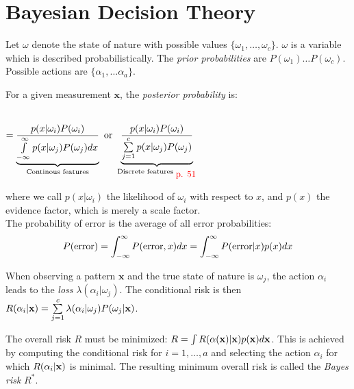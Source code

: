 \section{Bayesian Decision Theory}
\begin{minipage}{9.5cm}
Let $\omega$ denote the state of nature with possible values $\{\omega_1, \ldots, \omega_c\}$.
$\omega$ is a variable which is described probabilistically.
The \emph{prior probabilities} are $P(\omega_1) \ldots P(\omega_c)$.
Possible actions are $\{\alpha_1, \ldots \alpha_a\}$.

For a given measurement $\mathbf{x}$, the \emph{posterior probability} is:
\begin{center}
   \\
  $= \underbrace{\frac{p(x|\omega_i) P(\omega_i)}{\int\limits_{-\infty}^{\infty}p(x|\omega_j) P(\omega_j) dx}}_{\text{Continous features}}
    \text{ or } 
    \underbrace{\frac{p(x|\omega_i) P(\omega_i)}{\sum\limits_{j=1}^{c}p(x|\omega_j) P(\omega_j)}}_{\text{Discrete features $_{\textcolor{red}{\mbox{\small{p. 51}}}}$}}$
\end{center}
  
where we call $p(x|\omega_i)$ the likelihood of $\omega_i$ with respect to $x$, and $p(x)$ the evidence factor, which is merely a scale factor. \\

The probability of error is the average of all error probabilities:
\begin{align*}
    P(\mathrm{error}) &= \int_{-\infty}^{\infty} P(\mathrm{error}, x) dx = \int_{-\infty}^{\infty} P(\mathrm{error}|x) p(x) dx \\
\end{align*}

When observing a pattern $\mathbf{x}$ and the true state of nature is $\omega_j$, the action $\alpha_i$ leads to the \emph{loss} $\lambda(\alpha_i|\omega_j)$.
The conditional risk is then $R(\alpha_i|\mathbf{x}) = \sum\limits_{j=1}^c \lambda(\alpha_i|\omega_j)P(\omega_j|\mathbf{x})$.

The overall risk $R$ must be minimized: $R = \int R(\alpha(\mathbf{x})|\mathbf{x})p(\mathbf{x}) d\mathbf{x}$.
This is achieved by computing the conditional risk for $i=1,\ldots,a$ and selecting the action $\alpha_i$ for which $R(\alpha_i|\mathbf{x})$ is minimal.
The resulting minimum overall risk is called the \emph{Bayes risk} $R^*$.

\end{minipage} \vspace{1cm}
